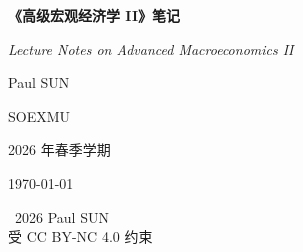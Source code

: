 \begin{titlepage}
  \centering
  \vspace*{2.5cm}

  {\Huge\bfseries 《高级宏观经济学 II》笔记}

  \vspace{1cm}

  {\Large\itshape Lecture Notes on Advanced Macroeconomics II}

  \vspace{4cm}

  {\Large Paul SUN}

  \vspace{0.1cm}

  {\large SOE\hspace{0.35em}\textperiodcentered\hspace{0.35em}XMU}

  \vspace{0.1cm}

  {}

  \vspace{1cm}

  {\large 2026 年春季学期}

  \vfill

  {\today}

  \vspace{0.5cm}

  {\small \textcopyright\ 2026 Paul SUN\\受 CC BY-NC 4.0 约束}

\end{titlepage}
